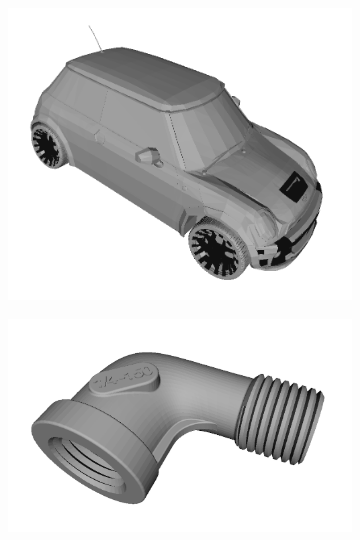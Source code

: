 \begin{figure}
\begin{subfigure}[t]{0.23\linewidth}
	\end{subfigure}
	\begin{subfigure}[t]{0.23\linewidth} \centering
		\includegraphics[width=1\linewidth]{./fig/eval/toshiba_mini1.png}
	\end{subfigure}
	\begin{subfigure}[t]{0.23\linewidth} \centering
		\includegraphics[width=1\linewidth]{./fig/eval/toshiba_pipe1.png}
	\end{subfigure}
	\begin{subfigure}[t]{0.23\linewidth} \centering

\end{subfigure}
\end{figure}
